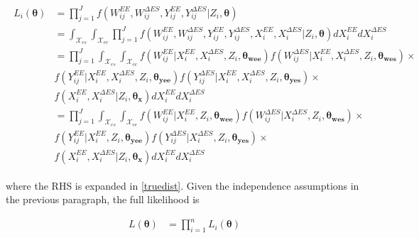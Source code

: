 \documentclass[11pt]{article}\usepackage[]{graphicx}\usepackage[]{color}
\begin{document}
\begin{align}
  \begin{split}
      \label{truedist}
  L_i(\boldsymbol{\theta}) &= \prod_{j=1}^{J} f(W_{ij}^{EE},W_{ij}^{\Delta ES}, Y_{ij}^{EE},Y_{ij}^{\Delta ES}|Z_i,\boldsymbol{\theta})  \\
   &=  \int_{\mathcal{X}_{es}} \int_{\mathcal{X}_{ee}} \prod_{j=1}^{J} f({ W_{ij}^{EE},W_{ij}^{\Delta ES}, Y_{ij}^{EE},Y_{ij}^{\Delta ES}, X_i^{EE}, X_i^{\Delta ES}|Z_i},\boldsymbol{\theta}) d{ X_i^{EE}} d{ X_i^{\Delta ES}} \\
    &= \prod_{j=1}^{J} \int_{\mathcal{X}_{es}} \int_{\mathcal{X}_{ee}} f({ W_{ij}^{EE}|X_i^{EE},X_i^{\Delta ES},Z_i},\boldsymbol{\theta_{wee}}) f({ W_{ij}^{\Delta ES}|X_i^{EE},X_i^{\Delta ES},Z_i},\boldsymbol{\theta_{wes}}) \times\\
  & f({ Y_{ij}^{EE}|X_i^{EE},X_i^{\Delta ES},Z_i},\boldsymbol{\theta_{yee}}) f({ Y_{ij}^{\Delta ES}|X_i^{EE},X_i^{\Delta ES},Z_i},\boldsymbol{\theta_{yes}}) \times  \\
  & f({ X_i^{EE}, X_i^{\Delta ES}|Z_i},\boldsymbol{\theta_x}) d{ X_i^{EE}} d{ X_i^{\Delta ES}} \\
  &= \prod_{j=1}^{J} \int_{\mathcal{X}_{es}} \int_{\mathcal{X}_{ee}} f({ W_{ij}^{EE}|X_i^{EE},Z_i},\boldsymbol{\theta_{wee}}) f({ W_{ij}^{\Delta ES}|X_i^{\Delta ES},Z_i},\boldsymbol{\theta_{wes}}) \times\\
  & f({ Y_{ij}^{EE}|X_i^{EE},Z_i},\boldsymbol{\theta_{yee}}) f({ Y_{ij}^{\Delta ES}|X_i^{\Delta ES},Z_i},\boldsymbol{\theta_{yes}}) \times  \\
  & f({ X_i^{EE}, X_i^{\Delta ES}|Z_i},\boldsymbol{\theta_x}) d{ X_i^{EE}} d{ X_i^{\Delta ES}} 
  \end{split}
\end{align}

where the RHS is expanded in \eqref{truedist}. Given the independence assumptions in the previous paragraph,  the full likelihood is

\begin{align}
  L(\boldsymbol{\theta}) &= \prod_{i=1}^{n}  L_i(\boldsymbol{\theta}) 
\end{align}



\end{document}
